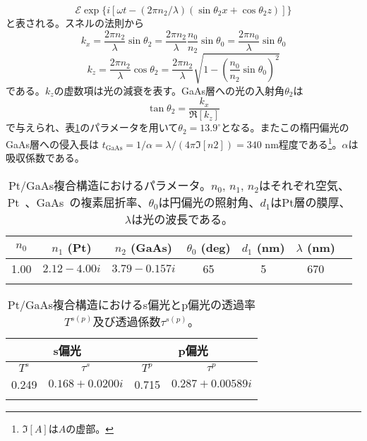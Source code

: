 \begin{equation}
{\mathscr{E}} \exp\{i[\omega t-(2\pi n_2/\lambda)(\sin\theta_2 x+\cos\theta_2 z)]\}
\end{equation}
と表される。スネルの法則から
\begin{equation}
k_x=\frac{2\pi n_2}{\lambda}\sin\theta_2=\frac{2\pi n_2}{\lambda}\frac{n_0}{n_2}\sin\theta_0=\frac{2\pi n_0}{\lambda}\sin\theta_0
\end{equation}
\begin{equation}
k_z=\frac{2\pi n_2}{\lambda}\cos\theta_2=\frac{2\pi n_2}{\lambda}\sqrt{1-\left(\frac{n_0}{n_2}\sin\theta_0\right)^2}
\end{equation}
である。$k_z$の虚数項は光の減衰を表す。GaAs層への光の入射角$\theta_2$は
\begin{equation}
\tan\theta_2=\frac{k_x}{\Re[k_z]}
\end{equation}
で与えられ、表\ref{paramet}のパラメータを用いて$\theta_2=13.9^\circ$となる。またこの楕円偏光のGaAs層への侵入長は
$t_\text{GaAs}=1/\alpha=\lambda/(4\pi\Im[n2])=340$ nm程度である\footnote{$\Im[A]$は$A$の虚部。}。$\alpha$は吸収係数である。



\begin{table}[tbp]
\begin{center}
\caption{Pt/GaAs複合構造におけるパラメータ。$n_0$, $n_1$, $n_2$はそれぞれ空気、Pt~\cite{Ordal}、GaAs~\cite{Adachi}の複素屈折率、$\theta_0$は円偏光の照射角、$d_1$はPt層の膜厚、$\lambda$は光の波長である。}
\begin{tabular}{ccccccc} 
\hline\hline
$n_0$ & $n_1$ (Pt) & $n_2$ (GaAs) & $\theta_0$ (deg) & $d_1$ (nm) & $\lambda$ (nm)  \\
\hline
1.00 & $2.12-4.00i$ & $3.79-0.157i$ & 65 & 5 & 670 \\
\hline\hline
\label{paramet}
\end{tabular}
\end{center}
\end{table}




\begin{table}[tbp]
\begin{center}
\caption{Pt/GaAs複合構造におけるs偏光とp偏光の透過率$T^{s(p)}$及び透過係数$\tau^{s(p)}$。}
\begin{tabular}{cccc} 
\hline\hline
\multicolumn{2}{c}{s偏光} & \multicolumn{2}{c}{p偏光} \\
\hline
$T^s$ & $\tau^s$ & $T^p$ & $\tau^p$ \\
\hline
0.249 & $0.168+0.0200i$ & 0.715 & $0.287+0.00589i$ \\
\hline\hline
\label{result}
\end{tabular}
\end{center}
\end{table}






